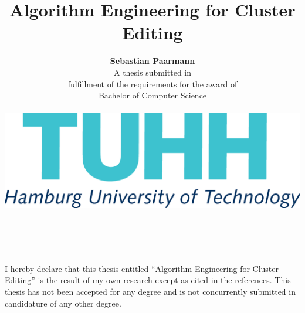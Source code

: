 \documentclass[12pt,oneside,english,parskip=full,headings=small]{scrbook}
\theoremstyle{definition}
\begin{document}
\frontmatter

\vspace{2.5cm}


\title{\textrm{\huge{}Algorithm Engineering for Cluster Editing}\\
	\vspace{1.8cm}
}

\author{\textbf{\LARGE{}Sebastian Paarmann}\vspace{2.5cm}
	\\
	{\normalsize{}A thesis submitted in}\\
	{\normalsize{}fulfillment of the requirements for the award of
	}\\
	{\normalsize{}Bachelor of Computer Science\vspace{3.1cm}
	}\\
	{\normalsize{}}\\
	{\normalsize{}\includegraphics[scale=0.2]{tuhh}}\\
	{\normalsize{}\vspace{3.1cm}
}}

\maketitle
\begin{center}
	$ $\thispagestyle{plain}\vspace{2cm}
\par\end{center}

\begin{center}
	I hereby declare that this thesis entitled \textquotedblleft Algorithm Engineering for Cluster
	Editing\textquotedblright{} is the result of my own
	research except as cited in the references. This thesis has not been
	accepted for any degree and is not concurrently submitted in candidature
	of any other degree. \vspace{2cm}
\par\end{center}
\end{document}
